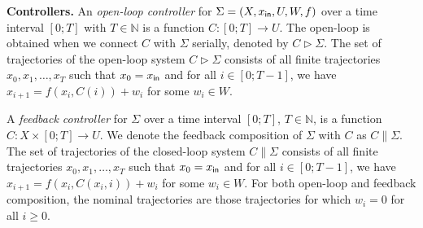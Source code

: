 \begin{comment}

\smallskip
\noindent\textbf{Transition System.}\
A \emph{state-transition system} $S=(Z,z_\init,U,\delta)$ consists of a \emph{state space} $Z$, an \emph{initial state} $z_\init\in Z$, an \emph{input space} $U$, and a \emph{transition function} $\delta:Z\times U \rightarrow 2^Z$. 
A system $S$ is \emph{finite} if $Z$ and $U$ are finite. 
A \emph{trajectory} of $S$ is a maximal sequence of states $\rho = (z_0,z_1,\ldots) \in Z^\infty$ starting at $z_0=z_\init$ and compatible with $\delta$:
for all $1\leq k < |\rho|$ there exists $u\in U$ such that $z_k\in \delta(z_{k-1},u)$ and 
if $|\rho| < \infty$ then $\delta(z_{|\rho|},u)= \emptyset$ for all $u\in U$.


\smallskip
\noindent\textbf{Product Transition System.}\
Let $\set{S^i}_{i\in [1;N]}$, $S^i=(Z^i,z_\init^i,U^i,\delta^i)$, be a set of $N$ transition systems.
The \emph{product transition system of } $\set{S^i}_{i\in [1;N]}$ is the transition system $S^\times \coloneqq (Z^\times, z_\init^\times, U^\times, \delta^\times)$ such that $Z^\times \coloneqq Z^1\times \ldots \times Z^N$, $z^\times_\init\coloneqq (z_\init^1,\ldots,z_\init^N)$, $U^\times \coloneqq U^1\times \ldots\times U^N$, and $\delta^\times \coloneqq \delta^1\otimes\ldots \otimes \delta^N$.
From here on, we omit the domain of $i$ and use ``$\set{S^i}$'' and ``$\set{\Sigma^i}$'' respectively for ``$\set{S^i}_{i\in [1;N]}$'' and ``$\set{\Sigma^i}_{i\in [1;N]}$'' to simplify the notation.


\end{comment}

\smallskip\noindent
\textbf{Controllers.} 
%
An \emph{open-loop controller} for $\Sigma=(X,x_{\mathsf{in}},U,W,f)$ over a time interval $[0;T]$ with $T\in\mathbb N$ 
is a function $C\colon [0;T]\to U$. 
The open-loop is obtained when we connect $C$ with $\Sigma$ serially,
 denoted by $C \triangleright \Sigma$. 
The set of trajectories of the open-loop system $C\triangleright\Sigma$ consists of all finite trajectories
$x_0, x_1, \ldots, x_T$ such that $x_0 = x_{\mathsf{in}}$ and for all $i \in [0; T-1]$, we have $x_{i+1} = f(x_i, C(i)) + w_i$ for some $w_i \in W$.

A \emph{feedback controller} for $\Sigma$ over a time interval $[0;T]$, $T\in \mathbb N$, 
is a function $C\colon X\times[0;T]\to U$. 
We denote the feedback composition of $\Sigma$ with $C$ as $C \parallel \Sigma$.
The set of trajectories of the closed-loop system $C\parallel\Sigma$ consists of all finite trajectories
$x_0, x_1, \ldots, x_T$ such that $x_0 = x_{\mathsf{in}}$ and for all $i \in [0; T-1]$, we have $x_{i+1} = f(x_i, C(x_i, i)) + w_i$ for some $w_i \in W$.
For both open-loop and feedback composition, the nominal trajectories are those trajectories for which $w_i = 0$ for all $i\geq 0$.

